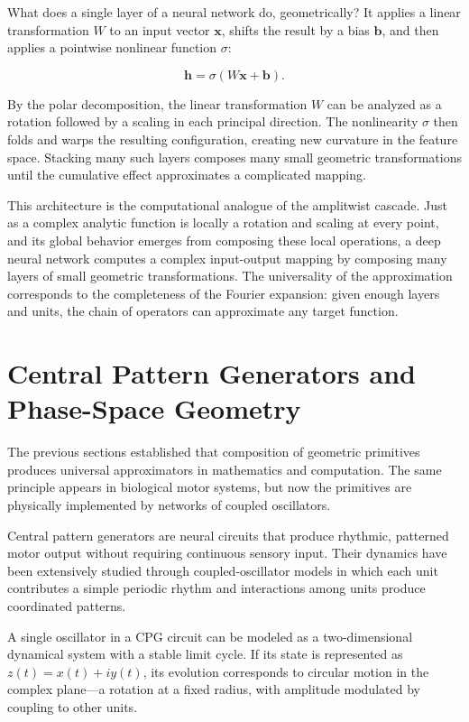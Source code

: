 \documentclass[11pt, a4paper]{article}
\theoremstyle{plain}
\theoremstyle{definition}
\theoremstyle{remark}
\begin{document}
What does a single layer of a neural network do, geometrically? It applies a linear
transformation $W$ to an input vector $\mathbf{x}$, shifts the result by a bias
$\mathbf{b}$, and then applies a pointwise nonlinear function $\sigma$:

\begin{equation}
\mathbf{h} = \sigma(W\mathbf{x} + \mathbf{b}).
\label{eq:neuron}
\end{equation}

By the polar decomposition, the linear transformation $W$ can be analyzed as a rotation
followed by a scaling in each principal direction. The nonlinearity $\sigma$ then folds
and warps the resulting configuration, creating new curvature in the feature space.
Stacking many such layers composes many small geometric transformations until the
cumulative effect approximates a complicated mapping.

This architecture is the computational analogue of the amplitwist cascade. Just as a
complex analytic function is locally a rotation and scaling at every point, and its
global behavior emerges from composing these local operations, a deep neural network
computes a complex input-output mapping by composing many layers of small geometric
transformations. The universality of the approximation corresponds to the completeness
of the Fourier expansion: given enough layers and units, the chain of operators can
approximate any target function.


\section{Central Pattern Generators and Phase-Space Geometry}

The previous sections established that composition of geometric primitives produces
universal approximators in mathematics and computation. The same principle appears in
biological motor systems, but now the primitives are physically implemented by networks
of coupled oscillators.

Central pattern generators are neural circuits that produce rhythmic, patterned motor
output without requiring continuous sensory input. Their dynamics have been extensively
studied through coupled-oscillator models in which each unit contributes a simple
periodic rhythm and interactions among units produce coordinated patterns.

A single oscillator in a CPG circuit can be modeled as a two-dimensional dynamical
system with a stable limit cycle. If its state is represented as $z(t) = x(t) + iy(t)$,
its evolution corresponds to circular motion in the complex plane---a rotation at a fixed
radius, with amplitude modulated by coupling to other units.
\end{document}
